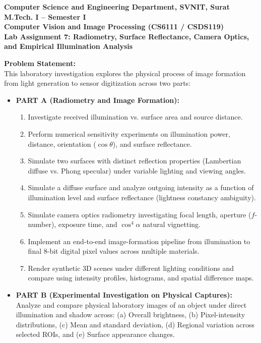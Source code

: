 \documentclass[12pt]{article}
\begin{document}
\begin{center}
\textbf{Computer Science and Engineering Department, SVNIT, Surat}\\
\textbf{M.Tech. I -- Semester I}\\
\textbf{Computer Vision and Image Processing (CS6111 / CSDS119)}\\
\textbf{Lab Assignment 7: Radiometry, Surface Reflectance, Camera Optics, and Empirical Illumination Analysis}
\end{center}

\vspace{0.3cm}

\textbf{Problem Statement:} \\
This laboratory investigation explores the physical process of image formation from light generation to sensor digitization across two parts:
\begin{itemize}
    \item \textbf{PART A (Radiometry and Image Formation):}
    \begin{enumerate}
        \item Investigate received illumination vs. surface area and source distance.
        \item Perform numerical sensitivity experiments on illumination power, distance, orientation ($\cos\theta$), and surface reflectance.
        \item Simulate two surfaces with distinct reflection properties (Lambertian diffuse vs. Phong specular) under variable lighting and viewing angles.
        \item Simulate a diffuse surface and analyze outgoing intensity as a function of illumination level and surface reflectance (lightness constancy ambiguity).
        \item Simulate camera optics radiometry investigating focal length, aperture ($f$-number), exposure time, and $\cos^4\alpha$ natural vignetting.
        \item Implement an end-to-end image-formation pipeline from illumination to final 8-bit digital pixel values across multiple materials.
        \item Render synthetic 3D scenes under different lighting conditions and compare using intensity profiles, histograms, and spatial difference maps.
    \end{enumerate}
    \item \textbf{PART B (Experimental Investigation on Physical Captures):} \\
    Analyze and compare physical laboratory images of an object under direct illumination and shadow across: (a) Overall brightness, (b) Pixel-intensity distributions, (c) Mean and standard deviation, (d) Regional variation across selected ROIs, and (e) Surface appearance changes.
\end{itemize}
\end{document}
